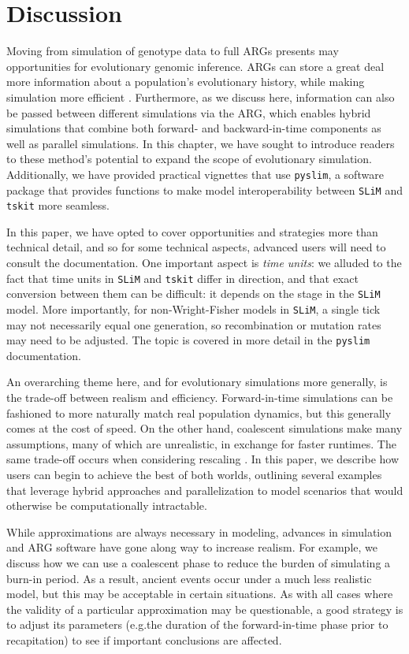 \documentclass[12pt]{article}
\newcommand{\tskit}[0]{\texttt{tskit}\xspace}
\newcommand{\slim}[0]{\texttt{SLiM}\xspace}
\newcommand{\pyslim}[0]{\texttt{pyslim}\xspace}
\newcommand*{\eg}{e.g.\xcomma}
\begin{document}
\section*{Discussion}

Moving from simulation of genotype data to full ARGs presents may opportunities for evolutionary genomic inference.
ARGs can store a great deal more information about a population's evolutionary history,
while making simulation more efficient \citep{kelleher_efficient_2018}.
Furthermore, as we discuss here, information can also be passed between different simulations via the ARG,
which enables hybrid simulations that combine both forward- and backward-in-time components as well as parallel simulations.
In this chapter, we have sought to introduce readers to these method's potential to expand the scope of evolutionary simulation.
Additionally, we have provided practical vignettes that use \pyslim,
a software package that provides functions to make model interoperability between \slim and \tskit more seamless.

In this paper, we have opted to cover opportunities and strategies more than technical detail,
and so for some technical aspects, advanced users will need to consult the documentation.
One important aspect is \emph{time units}:
we alluded to the fact that time units in \slim and \tskit differ in direction,
and that exact conversion between them can be difficult:
it depends on the stage in the \slim model.
More importantly, for non-Wright-Fisher models in \slim, a single tick may not necessarily equal one generation,
so recombination or mutation rates may need to be adjusted.
The topic is covered in more detail in the \pyslim documentation.

An overarching theme here, and for evolutionary simulations more generally, is the trade-off between realism and efficiency.
Forward-in-time simulations can be fashioned to more naturally match real population dynamics,
but this generally comes at the cost of speed. On the other hand, coalescent simulations make many assumptions, many of which
are unrealistic, in exchange for faster runtimes.
The same trade-off occurs when considering rescaling \citep{cury_simulation_2022,dabi_population_2025}.
In this paper, we describe how users can begin to achieve the best of both worlds,
outlining several examples that leverage hybrid approaches and parallelization to model scenarios that would otherwise be
computationally intractable.

While approximations are always necessary in modeling, advances in simulation and ARG software have gone along way to increase realism.
For example, we discuss how we
can use a coalescent phase to reduce the burden of simulating a burn-in period.
As a result, ancient events occur under a much less realistic model, but this may be acceptable in certain situations.
As with all cases where the validity of a particular approximation may be questionable, a good strategy is to adjust its parameters
(\eg the duration of the forward-in-time phase prior to recapitation) to see if important conclusions are affected.
\end{document}
